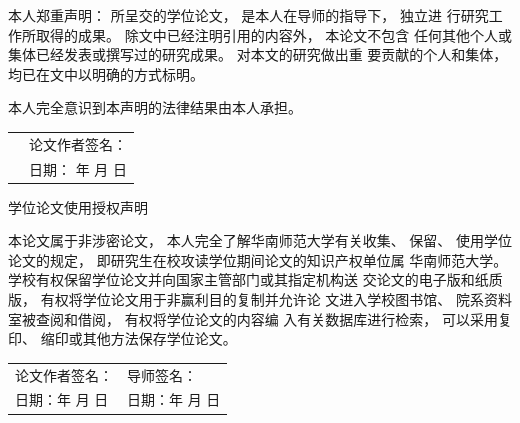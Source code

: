 \begin{statement}
	
\vspace{0.4cm} %
本人郑重声明： 所呈交的学位论文， 是本人在导师的指导下， 独立进\linebreak
行研究工作所取得的成果。 除文中已经注明引用的内容外， 本论文不包含\linebreak
任何其他个人或集体已经发表或撰写过的研究成果。 对本文的研究做出重\linebreak
要贡献的个人和集体， 均已在文中以明确的方式标明。

本人完全意识到本声明的法律结果由本人承担。\\

\noindent
\renewcommand{\arraystretch}{1.35}							
\begin{tabular}{p{9cm}p{9cm}}%
	& {\xiaosi\songti 论文作者签名：} \\
	& {\xiaosi\songti 日期： \qquad 年 \qquad 月 \qquad 日}
\end{tabular}
\par

\vspace{2cm} %
\begin{center}
	\heiti \sanhao 学位论文使用授权声明\\
\end{center}

\indent
本论文属于非涉密论文， 本人完全了解华南师范大学有关收集、 保留、\linebreak
使用学位论文的规定， 即研究生在校攻读学位期间论文的知识产权单位属\linebreak
华南师范大学。 学校有权保留学位论文并向国家主管部门或其指定机构送\linebreak
交论文的电子版和纸质版， 有权将学位论文用于非赢利目的复制并允许论\linebreak
文进入学校图书馆、 院系资料室被查阅和借阅， 有权将学位论文的内容编\linebreak
入有关数据库进行检索， 可以采用复印、 缩印或其他方法保存学位论文。\\

\noindent
\renewcommand{\arraystretch}{1.35}				
{			
\begin{tabular}{p{9cm}p{9cm}}%
	{\xiaosi\songti 论文作者签名：} & {\xiaosi\songti 导师签名：} \\
	{\xiaosi\songti 日期：\qquad 年 \qquad 月 \qquad 日} & {\xiaosi\songti 日期：\qquad 年 \qquad 月 \qquad 日}
\end{tabular}}\par
					
\end{statement}